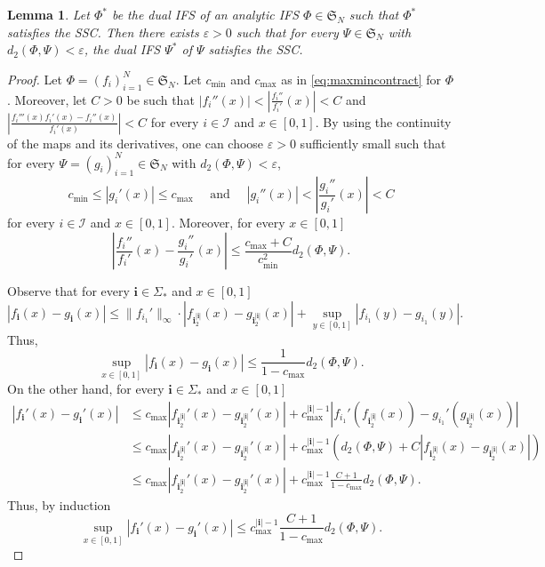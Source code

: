 \documentclass[11pt,]{article}
\def\cref#1{\ref{#1}}%
\newtheorem{lemma}[theorem]{Lemma}
\theoremstyle{definition}
\theoremstyle{remark}
\newcommand{\0}{\mathbf{0}}
\newcommand{\bi}{\mathbf{i}}
\begin{document}
\begin{lemma}\label{lem:cont}
  Let $\Phi^*$ be the dual IFS of an analytic IFS $\Phi\in\mathfrak{S}_N$ such that $\Phi^*$
  satisfies the SSC. Then there exists $\varepsilon>0$ such that for every $\Psi\in\mathfrak{S}_N$
  with $d_2(\Phi,\Psi)<\varepsilon$, the dual IFS $\Psi^*$ of $\Psi$ satisfies the SSC.
\end{lemma}

\begin{proof}
  Let $\Phi=(f_i)_{i=1}^N\in\mathfrak{S}_N$. Let $c_{\min}$ and $c_{\max}$ as in
  \cref{eq:maxmincontract} for $\Phi$. Moreover, let $C>0$ be such that
  $|f_i''(x)|<\left|\frac{f_i''}{f_i'}(x)\right|<C$ and
  $\left|\frac{f_i'''(x)f_i'(x)-f_i''(x)}{f_i'(x)}\right|<C$ for every $i\in\mathcal{I}$ and
  $x\in[0,1]$. By using the continuity of the maps and its derivatives, one can choose
  $\varepsilon>0$ sufficiently small such that for every $\Psi=(g_i)_{i=1}^N\in\mathfrak{S}_N$ with
  $d_2(\Phi,\Psi)<\varepsilon$, 
  $$
  c_{\min}\leq|g_i'(x)|\leq c_{\max}\quad\text{ and }\quad |g_i''(x)|<\left|\frac{g_i''}{g_i'}(x)\right|<C
  $$
  for every $i\in\mathcal{I}$ and $x\in[0,1]$. Moreover, for every $x\in[0,1]$
  \begin{equation}\label{eq:tec1}
    \left|\frac{f_i''}{f_i'}(x)-\frac{g_i''}{g_i'}(x)\right|\leq
    \frac{c_{\max}+C}{c_{\min}^{2}}d_2(\Phi,\Psi).
  \end{equation}

  Observe that for every $\bi\in\Sigma_*$ and $x\in[0,1]$
  $$
  |f_{\bi}(x)-g_{\bi}(x)|\leq\|f_{i_1}'\|_{\infty}\cdot
  |f_{\bi_2^{|\bi|}}(x)-g_{\bi_2^{|\bi|}}(x)|+\sup_{y\in[0,1]}|f_{i_1}(y)-g_{i_1}(y)|.
  $$ 
  Thus,
  \begin{equation}\label{eq:tec2}
    \sup_{x\in[0,1]}|f_{\bi}(x)-g_{\bi}(x)|\leq \frac{1}{1-c_{\max}}d_2(\Phi,\Psi).
  \end{equation}
  On the other hand, for every $\bi\in\Sigma_*$ and $x\in[0,1]$
  \begin{align*}
    |f_{\bi}'(x)-g_{\bi}'(x)|
    &\leq
    c_{\max}|f_{\bi_2^{|\bi|}}'(x)-g_{\bi_2^{|\bi|}}'(x)|+
    c_{\max}^{|\bi|-1}|f_{i_1}'(f_{\bi_2^{|\bi|}}(x))-g_{i_1}'(g_{\bi_2^{|\bi|}}(x))|\\
    &\leq c_{\max}|f_{\bi_2^{|\bi|}}'(x)-g_{\bi_2^{|\bi|}}'(x)|+c_{\max}^{|\bi|-1}\left(d_2(\Phi,\Psi)+C|f_{\bi_2^{|\bi|}}(x)-g_{\bi_2^{|\bi|}}(x)|\right)\\
    &\leq c_{\max}|f_{\bi_2^{|\bi|}}'(x)-g_{\bi_2^{|\bi|}}'(x)|+c_{\max}^{|\bi|-1}\frac{C+1}{1-c_{\max}}d_2(\Phi,\Psi).
  \end{align*}
  Thus, by induction
  \begin{equation}\label{eq:tec3}
    \sup_{x\in[0,1]}|f_{\bi}'(x)-g_{\bi}'(x)|\leq c_{\max}^{|\bi|-1}\frac{C+1}{1-c_{\max}}d_2(\Phi,\Psi).
  \end{equation}


\end{proof}
\end{document}
